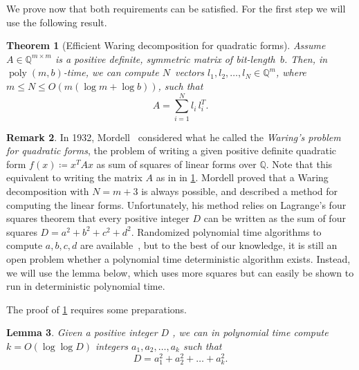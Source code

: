 \documentclass[10pt,a4paper]{article}
\newtheorem{theorem}{Theorem}[section]
\newtheorem{lemma}[theorem]{Lemma}
\theoremstyle{definition}
\newtheorem{remark}[theorem]{Remark}
\DeclareMathOperator{\poly}{poly}
\newcommand{\QQ}{\mathbb{Q}}
\numberwithin{equation}{section}
\begin{document}
We prove now that both requirements can be satisfied.
For the first step we will use the following result.

\begin{theorem}[Efficient Waring decomposition for quadratic forms]\label{thm:effectivemordell}
Assume $A\in\QQ^{m\times m}$ is a positive definite, symmetric matrix of bit-length~$b$.
Then, in $\poly(m,b)$-time,
we can compute
$N$~vectors $l_1,l_2,\dots,l_N\in\QQ^m$, where $m\leq N\leq O(m(\log m + \log b))$,
such that
\begin{equation*}%
A = \sum_{i=1}^N l_i\, l_i^T.
\end{equation*}
\end{theorem}

\begin{remark}
In 1932, Mordell~\cite{mordell} considered what he called the \textit{Waring's problem for quadratic forms},
the problem of writing a given positive definite quadratic form $f(x)\coloneqq x^T Ax$ as sum of squares of linear forms over $\QQ$.
Note that this equivalent to writing the matrix $A$ as in in \cref{thm:effectivemordell}. %
Mordell proved that a Waring decomposition with $N=m+3$ is always possible,
and described a method for computing the linear forms.
Unfortunately, his method relies on Lagrange's four squares theorem
that every positive integer $D$ can be written as the sum of four squares $D=a^2+b^2+c^2+d^2$.
Randomized polynomial time algorithms to compute $a,b,c,d$ are available~\cite{rabin-shallit},
but to the best of our knowledge, it is still an open problem whether a polynomial time deterministic algorithm exists.
Instead, we will use the lemma below, %
which uses more squares but can easily be shown to run in deterministic polynomial time.
\end{remark}

The proof of \cref{thm:effectivemordell} requires some preparations.

\begin{lemma}
\label{lem:sos}
Given a positive integer $D$ ,
we can in polynomial time compute
$k= O(\log \log D)$ integers $a_1,a_2,\dots,a_k$ such that
\[
 D = a_1^2 + a_2^2 + \dots + a_k^2.
\]
\end{lemma}
\end{document}
